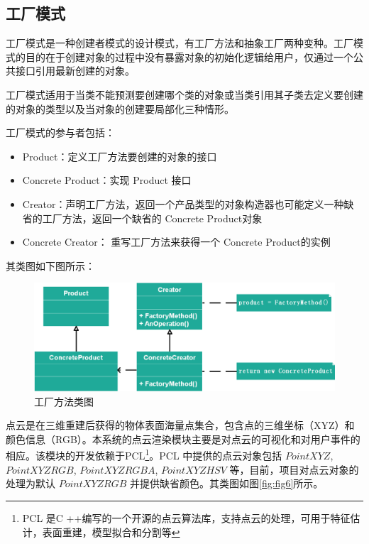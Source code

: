 \documentclass[article]{BJTU-thesis}
\begin{document}
\subsection{工厂模式}
工厂模式是一种创建者模式的设计模式，有工厂方法和抽象工厂两种变种。工厂模式的目的在于创建对象的过程中没有暴露对象的初始化逻辑给用户，仅通过一个公共接口引用最新创建的对象。

工厂模式适用于当类不能预测要创建哪个类的对象或当类引用其子类去定义要创建的对象的类型以及当对象的创建要局部化三种情形。

工厂模式的参与者包括：

\begin{itemize}
	\item Product：定义工厂方法要创建的对象的接口
	\item Concrete Product：实现 Product 接口
	\item Creator：声明工厂方法，返回一个产品类型的对象构造器也可能定义一种缺省的工厂方法，返回一个缺省的 Concrete Product对象
	\item Concrete Creator：	重写工厂方法来获得一个 Concrete Product的实例
\end{itemize}

其类图如下图所示：

	 	\begin{figure}[!htbp]
	\centering
	\includegraphics[scale=0.5]{15.png}
	\caption{工厂方法类图}
\end{figure}

点云是在三维重建后获得的物体表面海量点集合，包含点的三维坐标（XYZ）和颜色信息（RGB）。本系统的点云渲染模块主要是对点云的可视化和对用户事件的相应。该模块的开发依赖于PCL\footnote{PCL 是C ++编写的一个开源的点云算法库，支持点云的处理，可用于特征估计，表面重建，模型拟合和分割等}。PCL 中提供的点云对象包括 $PointXYZ$, $PointXYZRGB$, $PointXYZRGBA$, $PointXYZHSV$ 等，目前，项目对点云对象的处理为默认 $PointXYZRGB$ 并提供缺省颜色。其类图如图\ref{fig:fig6}所示。
\end{document}
